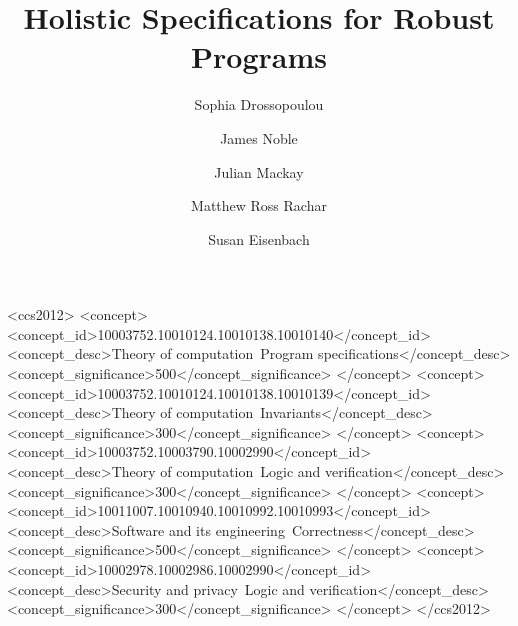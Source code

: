 \documentclass[acmsmall]{acmart}
\begin{document}

\title{Holistic Specifications for Robust Programs}

\author{Sophia Drossopoulou}

\author{James Noble}

\author{Julian Mackay}

\author{Matthew Ross Rachar}

\author{Susan Eisenbach}


\begin{CCSXML}
<ccs2012>
	<concept>
		<concept_id>10003752.10010124.10010138.10010140</concept_id>
		<concept_desc>Theory of computation~Program specifications</concept_desc>
		<concept_significance>500</concept_significance>
	</concept>
	<concept>
		<concept_id>10003752.10010124.10010138.10010139</concept_id>
		<concept_desc>Theory of computation~Invariants</concept_desc>
		<concept_significance>300</concept_significance>
	</concept>
	<concept>
		<concept_id>10003752.10003790.10002990</concept_id>
		<concept_desc>Theory of computation~Logic and verification</concept_desc>
		<concept_significance>300</concept_significance>
	</concept>
	<concept>
		<concept_id>10011007.10010940.10010992.10010993</concept_id>
		<concept_desc>Software and its engineering~Correctness</concept_desc>
	<concept_significance>500</concept_significance>
	</concept>
	<concept>
	<concept_id>10002978.10002986.10002990</concept_id>
		<concept_desc>Security and privacy~Logic and verification</concept_desc>
		<concept_significance>300</concept_significance>
	</concept>
</ccs2012>
\end{CCSXML}
\end{document}
